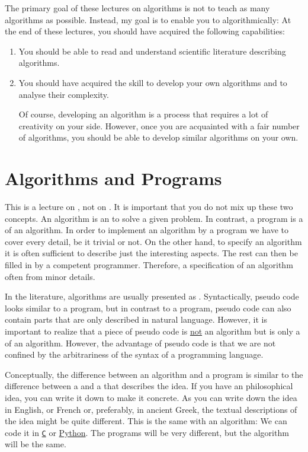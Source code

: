 The primary goal of these lectures on algorithms is not to teach as many algorithms as possible.
Instead, my goal is to enable you to  algorithmically:  At the end of these
lectures, you should have acquired the following capabilities:
\pagebreak
\begin{enumerate}
\item You should be able to read and understand scientific literature describing algorithms.
\item You should have acquired the skill to develop your own algorithms and to analyse their complexity.

      Of course, developing an algorithm is a process that requires a lot of creativity on your side.  However,
      once you are acquainted with a fair number of algorithms, you should be able to develop similar
      algorithms on your own. 
\end{enumerate}


\section{Algorithms and Programs}
This is a lecture on , not on .  It is important that you do not mix up
these two concepts.  An algorithm  is an  to solve a given problem.  In
contrast, a program is a  of an algorithm.  In order to implement an
algorithm by a program we have to cover every detail, be it trivial or not.  On the other hand, 
to specify an algorithm it is often sufficient to describe just the interesting aspects.  The rest can then be
filled in by a competent programmer.  Therefore, a specification of an algorithm often  from minor
details. 

In the literature, algorithms are usually presented as . 
Syntactically, pseudo code looks
similar to a program, but in contrast to a program, pseudo code can also contain parts that are only
described in natural language.   However, it is important to realize that a piece of pseudo code is
\underline{not} an algorithm but is only a  of an algorithm.  However, the
advantage of pseudo code is that we are not confined by the arbitrariness of the syntax of a
programming language.

Conceptually, the difference between an algorithm and a program is similar to the difference between
a  and a  that describes the idea.  If you have an philosophical idea, you
can write it down to make it concrete.  As you can write down the idea in English, or French or, preferably, in
ancient Greek, the textual descriptions of the idea might be quite different.  This is the same with an algorithm:
We can code it in \href{https://en.wikipedia.org/wiki/C_(programming_language)}{\texttt{C}} or
\href{http://python.org}{Python}.  The programs will be very different, but the algorithm will be the same. 

